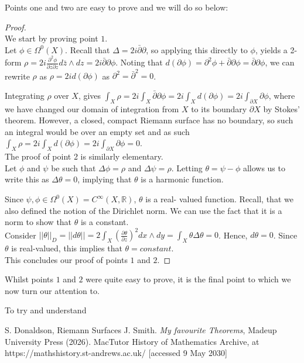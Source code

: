 \documentclass[a4paper,12pt]{report}
\theoremstyle{plain}
\theoremstyle{definition}
\begin{document}
Points one and two are easy to prove and we will do so below:
\begin{proof} ~\\
We start by proving point $1.$ ~\\
Let $\phi \in \Omega^0(X)$. Recall that $\Delta = 2i\bar{\partial}\partial$, so 
applying this directly to $\phi$, yields a 2-form $\rho = 2i\frac{\partial^2\phi}
{\partial \bar{z}\partial z} d\bar{z}\wedge dz = 2i \bar{\partial}\partial \phi$. 
Noting that $d(\partial \phi) = \partial^2 \phi + \bar{\partial}\partial \phi = 
\bar{\partial}\partial \phi $, we can rewrite $\rho$ as $\rho = 2id(\partial 
\phi)$ as $\partial^2 = \bar{\partial}^2 = 0$.

Integrating $\rho$ over $X$, gives $\int_X \rho = 2i\int_X
\bar{\partial}\partial \phi = 2i \int_X d(\partial \phi) = 2i \int_{\partial X}
\partial \phi$, where we have changed our domain of integration from $X$ to its
boundary $\partial X$ by Stokes' theorem. However, a closed, compact Riemann
surface has no boundary, so such an integral would be over an empty set and as
such $\int_X \rho = 2i\int_X d(\partial \phi) = 2i\int_{\partial X} \partial \phi = 0$. ~\\

The proof of point 2 is similarly elementary. ~\\
Let $\phi$ and $\psi$ be such that $\Delta \phi = \rho$ and $\Delta \psi = \rho$. 
Letting $\theta = \psi - \phi$ allows us to write this as $\Delta \theta = 0$, 
implying that $\theta$ is a harmonic function.

Since $\psi,\phi \in \Omega^0(X)=C^{\infty}(X,\mathbb{R})$, $\theta$ is a real-
valued function.
Recall, that we also defined the notion of the Dirichlet norm. We can use the 
fact that it is a norm to show that $\theta$ is a constant. ~\\
Consider $||\theta||_D = ||d\theta|| = 2 \int_X (\frac{\partial \theta}{\partial 
z})^2 dx \wedge dy = \int_X \theta \Delta \theta = 0$.
Hence, $d\theta = 0$. Since $\theta$ is real-valued, this implies that 
$\theta = constant$. ~\\
This concludes our proof of points $1$ and $2$. 
\end{proof}
Whilst points $1$ and $2$ were quite easy to prove, it is the final point to 
which we now turn our attention to.

To try and understand 

%
\begin{thebibliography}{99}
 S. Donaldson, Riemann Surfaces
 J. Smith. {\em My favourite Theorems}, Madeup University Press (2026).
%
 MacTutor History of Mathematics Archive, at https://mathshistory.st-andrews.ac.uk/ [accessed 9 May 2030]
\end{thebibliography}
\end{document}
